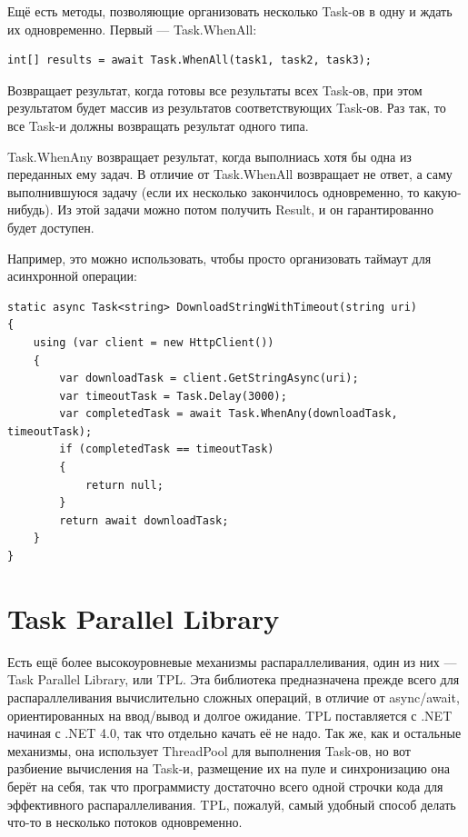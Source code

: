 \documentclass{../../text-style}
\begin{document}
Ещё есть методы, позволяющие организовать несколько Task-ов в одну и ждать их одновременно. Первый --- Task.WhenAll:

\begin{verbatim}
int[] results = await Task.WhenAll(task1, task2, task3);
\end{verbatim}

Возвращает результат, когда готовы все результаты всех Task-ов, при этом результатом будет массив из результатов соответствующих Task-ов. Раз так, то все Task-и должны возвращать результат одного типа.

Task.WhenAny возвращает результат, когда выполниась хотя бы одна из переданных ему задач. В отличие от Task.WhenAll возвращает не ответ, а саму выполнившуюся задачу (если их несколько закончилось одновременно, то какую-нибудь). Из этой задачи можно потом получить Result, и он гарантированно будет доступен.

Например, это можно использовать, чтобы просто организовать таймаут для асинхронной операции:

\begin{verbatim}
static async Task<string> DownloadStringWithTimeout(string uri)
{
    using (var client = new HttpClient())
    {
        var downloadTask = client.GetStringAsync(uri);
        var timeoutTask = Task.Delay(3000);
        var completedTask = await Task.WhenAny(downloadTask, timeoutTask);
        if (completedTask == timeoutTask)
        {
            return null;
        }
        return await downloadTask;
    }
}
\end{verbatim}

\section{Task Parallel Library}

Есть ещё более высокоуровневые механизмы распараллеливания, один из них --- Task Parallel Library, или TPL. Эта библиотека предназначена прежде всего для распараллеливания вычислительно сложных операций, в отличие от async/await, ориентированных на ввод/вывод и долгое ожидание. TPL поставляется с .NET начиная с .NET 4.0, так что отдельно качать её не надо. Так же, как и остальные механизмы, она использует ThreadPool для выполнения Task-ов, но вот разбиение вычисления на Task-и, размещение их на пуле и синхронизацию она берёт на себя, так что программисту достаточно всего одной строчки кода для эффективного распараллеливания. TPL, пожалуй, самый удобный способ делать что-то в несколько потоков одновременно.
\end{document}
